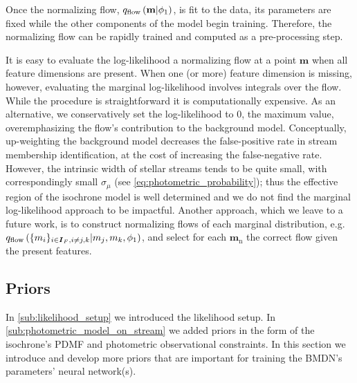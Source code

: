 \documentclass[twocolumn]{aastex631}
\newcommand{\mrm}[1]{\mathrm{#1}}
\newcommand{\mbs}[1]{\boldsymbol{#1}}
\newcommand{\nth}[1]{{#1}_{\mrm{n}}}  %
\begin{document}
            Once the normalizing flow, $q_{\rm flow}\left(\mathbf{m} | \phi_1\right)$, is fit to the data, its parameters are fixed while the other components of the model begin training. Therefore, the normalizing flow can be rapidly trained and computed as a pre-processing step.

            It is easy to evaluate the log-likelihood a normalizing flow at a point $\mbs{m}$ when all feature dimensions are present. When one (or more) feature dimension is missing, however, evaluating the marginal log-likelihood involves integrals over the flow. While the procedure is straightforward it is computationally expensive. As an alternative, we conservatively set the log-likelihood to $0$, the maximum value, overemphasizing the flow's contribution to the background model. Conceptually, up-weighting the background model decreases the false-positive rate in stream membership identification, at the
            cost of increasing the false-negative rate. However, the intrinsic width of stellar streams tends to be quite small, with correspondingly small $\sigma_\mu$ (see \autoref{eq:photometric_probability}); thus the effective region of the isochrone model is well determined and we do not find the marginal log-likelihood approach to be impactful. Another approach, which we leave to a future work, is to construct normalizing flows of each marginal distribution, e.g. $q_{\rm flow}\left(\{m_i\}_{i \in \mbs{I}_F, i \neq {j, k}} | m_j, m_k, \phi_1\right)$, and select for each $\nth{\mbs{m}}$ the correct flow given the present features.

    


    \subsection{Priors} \label{sub:priors}

        In \autoref{sub:likelihood_setup} we introduced the likelihood setup. In \autoref{sub:photometric_model_on_stream} we added priors in the form of the isochrone's PDMF and photometric observational constraints. In this section we
        introduce and develop more priors that are important for training the BMDN's parameters' neural network(s).
\end{document}
